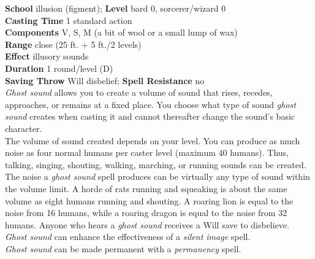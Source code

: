 \textbf{School} illusion (figment); \textbf{Level} bard 0, sorcerer/wizard 0\\
\textbf{Casting Time} 1 standard action\\
\textbf{Components} V, S, M (a bit of wool or a small lump of wax)\\
\textbf{Range} close (25 ft. + 5 ft./2 levels)\\
\textbf{Effect} illusory sounds\\
\textbf{Duration} 1 round/level (D)\\
\textbf{Saving Throw }Will disbelief; \textbf{Spell Resistance} no\\
\textit{Ghost sound }allows you to create a volume of sound that rises, recedes, approaches, or remains at a fixed place. You choose what type of sound \textit{ghost sound }creates when casting it and cannot thereafter change the sound's basic character.\\
The volume of sound created depends on your level. You can produce as much noise as four normal humans per caster level (maximum 40 humans). Thus, talking, singing, shouting, walking, marching, or running sounds can be created. The noise a \textit{ghost sound }spell produces can be virtually any type of sound within the volume limit. A horde of rats running and squeaking is about the same volume as eight humans running and shouting. A roaring lion is equal to the noise from 16 humans, while a roaring dragon is equal to the noise from 32 humans. Anyone who hears a \textit{ghost sound} receives a Will save to disbelieve.\\
\textit{Ghost sound }can enhance the effectiveness of a \textit{silent image }spell.\\
\textit{Ghost sound }can be made permanent with a \textit{permanency }spell.\\
